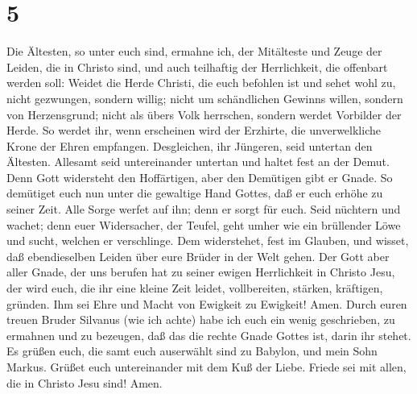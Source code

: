 \hypertarget{section-4}{%
\section{5}\label{section-4}}

 Die Ältesten, so unter euch sind, ermahne ich, der
Mitälteste und Zeuge der Leiden, die in Christo sind, und auch
teilhaftig der Herrlichkeit, die offenbart werden soll: 
Weidet die Herde Christi, die euch befohlen ist und sehet wohl zu, nicht
gezwungen, sondern willig; nicht um schändlichen Gewinns willen, sondern
von Herzensgrund;  nicht als übers Volk herrschen, sondern
werdet Vorbilder der Herde.  So werdet ihr, wenn erscheinen
wird der Erzhirte, die unverwelkliche Krone der Ehren empfangen.
 Desgleichen, ihr Jüngeren, seid untertan den Ältesten.
Allesamt seid untereinander untertan und haltet fest an der Demut. Denn
Gott widersteht den Hoffärtigen, aber den Demütigen gibt er Gnade.
 So demütiget euch nun unter die gewaltige Hand Gottes, daß
er euch erhöhe zu seiner Zeit.  Alle Sorge werfet auf ihn;
denn er sorgt für euch.  Seid nüchtern und wachet; denn euer
Widersacher, der Teufel, geht umher wie ein brüllender Löwe und sucht,
welchen er verschlinge.  Dem widerstehet, fest im Glauben,
und wisset, daß ebendieselben Leiden über eure Brüder in der Welt gehen.
 Der Gott aber aller Gnade, der uns berufen hat zu seiner
ewigen Herrlichkeit in Christo Jesu, der wird euch, die ihr eine kleine
Zeit leidet, vollbereiten, stärken, kräftigen, gründen. 
Ihm sei Ehre und Macht von Ewigkeit zu Ewigkeit! Amen. 
Durch euren treuen Bruder Silvanus (wie ich achte) habe ich euch ein
wenig geschrieben, zu ermahnen und zu bezeugen, daß das die rechte Gnade
Gottes ist, darin ihr stehet.  Es grüßen euch, die samt
euch auserwählt sind zu Babylon, und mein Sohn Markus. 
Grüßet euch untereinander mit dem Kuß der Liebe. Friede sei mit allen,
die in Christo Jesu sind! Amen.

